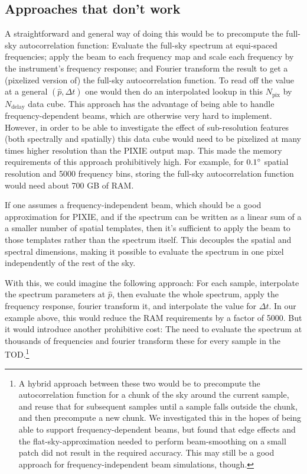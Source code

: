 \documentclass{article}
\begin{document}
\subsection{Approaches that don't work}
\label{s:autocorr-problems}
A straightforward and general way of doing this would be to precompute the
full-sky autocorrelation function: Evaluate the full-sky spectrum at equi-spaced
frequencies; apply the beam to each frequency map and scale each frequency by
the instrument's frequency response; and Fourier transform the result
to get a (pixelized version of) the full-sky autocorrelation function. To read off
the value at a general $(\hat p, \Delta t)$ one would then do an interpolated lookup
in this $N_\textrm{pix}$ by $N_\textrm{delay}$ data cube. This approach has the
advantage of being able to handle frequency-dependent beams, which are otherwise
very hard to implement. However, in order to be able to investigate the effect
of sub-resolution features (both spectrally and spatially) this data cube would
need to be pixelized at many times higher resolution than the PIXIE output map.
This made the memory requirements of this approach prohibitively high. For example,
for $0.1\degree$ spatial resolution and 5000 frequency bins, storing the full-sky
autocorrelation function would need about 700 GB of RAM.

If one assumes a frequency-independent beam, which should be a good approximation
for PIXIE, and if the spectrum can be written as a linear sum of a a smaller
number of spatial templates, then it's sufficient to apply the beam to those
templates rather than the spectrum itself. This
decouples the spatial and spectral dimensions, making it possible to evaluate the
spectrum in one pixel independently of the rest of the sky.

With this, we could
imagine the following approach: For each sample, interpolate the spectrum parameters
at $\hat p$, then evaluate the whole spectrum, apply the frequency response,
fourier transform it,
and interpolate the value for $\Delta t$. In our example above, this would reduce
the RAM requirements by a factor of 5000. But it would introduce another prohibitive
cost: The need to evaluate the spectrum at thousands of frequencies and fourier transform
these for every sample in the TOD.\footnote{
A hybrid approach between these two would be to precompute the autocorrelation function
for a chunk of the sky around the current sample, and reuse that for subsequent samples
until a sample falls outside the chunk, and then precompute a new chunk. We investigated
this in the hopes of being able to support frequency-dependent beams, but found that
edge effects and the flat-sky-approximation needed to perform beam-smoothing on a small
patch did not result in the required accuracy. This may still be a good approach for
frequency-independent beam simulations, though.}
\end{document}
